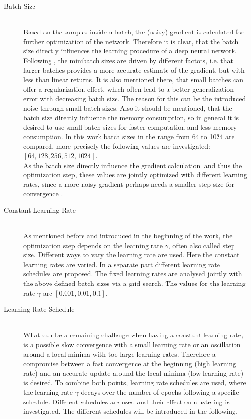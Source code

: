 \documentclass[12pt,DIV14,BCOR12mm,a4paper,footexclude,headinclude,halfparskip-,twoside,openright,cleardoubleempty,idxtotoc,bibtotoc,listtotoc,abstracton]{scrreprt} %
\numberwithin{equation}{chapter}
\begin{document}
\begin{description}
	\item[Batch Size]\hfill \\
	Based on the samples inside a batch, the (noisy) gradient is calculated for further optimization of the network. Therefore it is clear, that the batch size directly influences the learning procedure of a deep neural network. Following \cite{Goodfellow-et-al-2016}, the minibatch sizes are driven by  different factors, i.e. that larger batches provides a more accurate estimate of the gradient, but with less than linear returns. It is also mentioned there, that small batches can offer a regularization effect, which often lead to a better generalization error with decreasing batch size. The reason for this can be the introduced noise through small batch sizes. Also it should be mentioned, that the batch size directly influence the memory consumption, so in general it is desired to use small batch sizes for faster computation and less memory consumption. In this work batch sizes in the range from 64 to 1024 are compared, more precisely the following values are investigated: $[64, 128, 256, 512, 1024]$.\\ As the batch size directly influence the gradient calculation, and thus the optimization step, these values are jointly optimized with different learning rates, since a more noisy gradient perhaps needs a smaller step size for convergence \cite{Goodfellow-et-al-2016}.
	\item[Constant Learning Rate]\hfill \\
	As mentioned before and introduced in the beginning of the work, the optimization step depends on the learning rate $\gamma$, often also called step size. Different ways to vary the learning rate are used. Here the constant learning rates are varied. In a separate part different learning rate schedules are proposed. The fixed learning rates are analysed jointly with the above defined batch sizes via a grid search. The values for the learning rate $\gamma$ are $[0.001, 0.01, 0.1]$.
	\item[Learning Rate Schedule]\hfill \\
	What can be a remaining challenge when having a constant learning rate, is a possible slow convergence with a small learning rate or an oscillation around a local minima with too large learning rates. Therefore a compromise between a fast convergence at the beginning (high learning rate) and an accurate update around the local minima (low learning rate) is desired. To combine both points, learning rate schedules are used, where the learning rate $\gamma$ decays over the number of epochs following a specific schedule. Different schedules are used and their effect on clustering is investigated. The different schedules will be introduced in the following.

\end{description}
\end{document}
